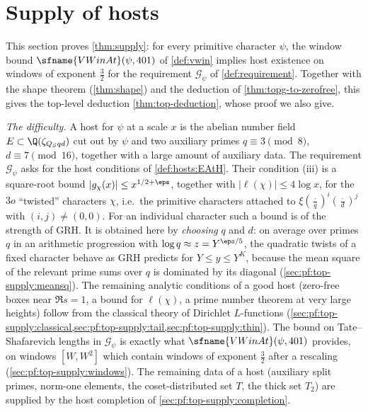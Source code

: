 \section{Supply of hosts}\label{sec:pf:top-supply}

\providecommand{\topsupplyJ}[2]{\left(\frac{#1}{#2}\right)}
\providecommand{\topsupplyPP}{\operatorname{PP}}
\providecommand{\topsupplyli}{\operatorname{li}}
\providecommand{\topsupplyht}{\operatorname{ht}}
\providecommand{\topsupplytw}{\operatorname{tw}}
\providecommand{\topsupplytail}{\operatorname{tail}}
\providecommand{\topsupplyodd}{\operatorname{odd}}
\providecommand{\topsupplysout}{\operatorname{sq}}
\providecommand{\topsupplyann}{\operatorname{ann}}
\providecommand{\topsupplypat}{\operatorname{pat}}
\providecommand{\topsupplyE}{\mathbf{E}}
\providecommand{\topsupplyPr}{\mathbf{P}}
\providecommand{\topsupplyBin}{\mathcal{B}}

This section proves \cref{thm:supply}: for every primitive character $\psi$, the window bound
$\sfname{VWinAt}(\psi,401)$ of \cref{def:vwin} implies host existence on windows of exponent $\frac32$ for the
requirement $\mathcal G_\psi$ of \cref{def:requirement}. Together with the shape theorem (\cref{thm:shape}) and
the deduction of \cref{thm:topg-to-zerofree}, this gives the top-level deduction \cref{thm:top-deduction}, whose
proof we also give.

\smallskip\noindent\emph{The difficulty.} A host for $\psi$ at a scale $x$ is the abelian number field
$E\subset\Q(\zeta_{Q_Sqd})$ cut out by $\psi$ and two auxiliary primes $q\equiv3\pmod8$, $d\equiv7\pmod{16}$,
together with a large amount of auxiliary data. The requirement $\mathcal G_\psi$ asks for the host conditions of
\cref{def:hosts:EAtH}. Their condition (iii) is a square-root bound $|g_\chi(x)|\le x^{1/2+\eps}$, together with
$|\ell(\chi)|\le4\log x$, for the $3o$ ``twisted'' characters $\chi$, i.e.\ the primitive characters attached to
$\xi\topsupplyJ{\cdot}{q}^i\topsupplyJ{\cdot}{d}^j$ with $(i,j)\ne(0,0)$. For an individual character such a bound
is of the strength of GRH. It is obtained here by \emph{choosing} $q$ and $d$: on average over primes $q$ in an
arithmetic progression with $\log q\approx z=Y^{\eps/5}$, the quadratic twists of a fixed character behave as GRH
predicts for $Y\le y\le Y^K$, because the mean square of the relevant prime sums over $q$ is dominated by its diagonal
(\cref{sec:pf:top-supply:meansq}). The remaining analytic conditions of a good host (zero-free boxes near
$\Re s=1$, a bound for $\ell(\chi)$, a prime number theorem at very large heights) follow from the classical theory
of Dirichlet $L$-functions (\cref{sec:pf:top-supply:classical,sec:pf:top-supply:tail,sec:pf:top-supply:thin}).
The bound on Tate--Shafarevich lengths in $\mathcal G_\psi$ is exactly what $\sfname{VWinAt}(\psi,401)$
provides, on windows $[W,W^2]$ which contain windows of exponent $\frac32$ after a rescaling
(\cref{sec:pf:top-supply:windows}). The remaining data of a host (auxiliary split primes, norm-one elements, the
coset-distributed set $T$, the thick set $T_2$) are supplied by the host completion of
\cref{sec:pf:top-supply:completion}.

